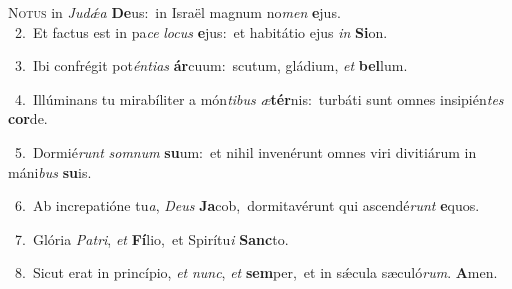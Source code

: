 \lettrine{\initial\textcolor{\initialcolor}{N}}{otus} in \textit{Ju}\-\textit{dǽ}\textit{a} \textbf{De}\-us:~\star in Israël magnum no\textit{men} \textbf{e}\-jus.\\
{\numbfont\textcolor{\numbcolor}{~2.}}~Et factus est in pa\textit{ce} \textit{lo}\-\textit{cus} \textbf{e}\-jus:~\star et habitátio ejus \textit{in} \textbf{Si}\-on.\par
{\numbfont\textcolor{\numbcolor}{~3.}}~Ibi confrégit pot\-\textit{én}\-\textit{ti}\textit{as} \textbf{ár}\-cuum:~\star scutum, gládium, \textit{et} \textbf{bel}\-lum.\par
{\numbfont\textcolor{\numbcolor}{~4.}}~Illúminans tu mirabíliter a món\-\textit{ti}\-\textit{bus} \textit{æ}\-\textbf{tér}nis:~\star turbáti sunt omnes insipién\textit{tes} \textbf{cor}\-de.\par
{\numbfont\textcolor{\numbcolor}{~5.}}~Dormié\textit{runt} \textit{som}\-\textit{num} \textbf{su}\-um:~\star et nihil invenérunt omnes viri divitiárum in máni\textit{bus} \textbf{su}\-is.\par
{\numbfont\textcolor{\numbcolor}{~6.}}~Ab increpatióne tu\-\textit{a}\-, \textit{De}\-\textit{us} \textbf{Ja}\-cob,~\star dormitavérunt qui ascendé\textit{runt} \textbf{e}\-quos.\par
{\numbfont\textcolor{\numbcolor}{~7.}}~Glória \textit{Pa}\-\textit{tri}, \textit{et} \textbf{Fí}\-lio,~\star et Spirítu\textit{i} \textbf{Sanc}\-to.\par
{\numbfont\textcolor{\numbcolor}{~8.}}~Sicut erat in princípio, \textit{et} \textit{nunc}\-, \textit{et} \textbf{sem}\-per,~\star et in sǽcula sæculó\-\textit{rum}\-. \textbf{A}\-men.\par
